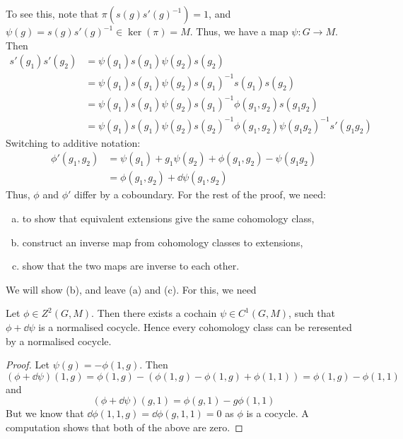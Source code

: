 \documentclass{article}
\begin{document}
To see this, note that \(\pi(s(g)s'(g)^{-1}) = 1\), and \(\psi(g) = s(g)s'(g)^{-1} \in \ker(\pi) = M\). Thus, we have a map \(\psi : G \to M\). Then
\begin{align*}
    s'(g_1)s'(g_2) &= \psi(g_1)s(g_1)\psi(g_2)s(g_2) \\
    &= \psi(g_1)s(g_1)\psi(g_2)s(g_1)^{-1}s(g_1)s(g_2) \\
    &= \psi(g_1)s(g_1)\psi(g_2)s(g_1)^{-1}\phi(g_1, g_2)s(g_1g_2) \\
    &= \psi(g_1)s(g_1)\psi(g_2)s(g_2)^{-1}\phi(g_1, g_2)\psi(g_1g_2)^{-1}s'(g_1g_2)
\end{align*}
Switching to additive notation:
\begin{align*}
    \phi'(g_1, g_2) &= \psi(g_1) + g_1\psi(g_2) + \phi(g_1, g_2) - \psi(g_1g_2) \\
    &= \phi(g_1, g_2) + \dd\psi(g_1, g_2)
\end{align*}
Thus, \(\phi\) and \(\phi'\) differ by a coboundary. For the rest of the proof, we need:
\begin{enumerate}[(a)]
    \item to show that equivalent extensions give the same cohomology class,
    \item construct an inverse map from cohomology classes to extensions,
    \item show that the two maps are inverse to each other.
\end{enumerate}
We will show (b), and leave (a) and (c). For this, we need
\begin{lemma}
    Let \(\phi \in Z^2(G, M)\). Then there exists a cochain \(\psi \in C^1(G, M)\), such that \(\phi + \dd\psi\) is a normalised cocycle. Hence every cohomology class can be reresented by a normalised cocycle.
\end{lemma}
\begin{proof}
    Let \(\psi(g) = -\phi(1, g)\). Then
    \[(\phi + \dd\psi)(1, g) = \phi(1, g) - \left(\phi(1, g) - \phi(1, g) + \phi(1, 1)\right) = \phi(1, g) - \phi(1, 1)\]
    and
    \[(\phi + \dd\psi)(g, 1) = \phi(g, 1) - g\phi(1, 1)\]
    But we know that \(\dd\phi(1, 1, g) = \dd\phi(g, 1, 1) = 0\) as \(\phi\) is a cocycle. A computation shows that both of the above are zero.
\end{proof}
\end{document}
